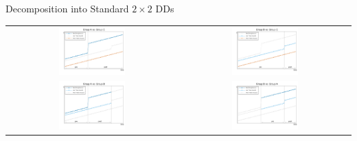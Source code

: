 \documentclass[10pt,xcolor=table,ignorenonframetext,handout,aspectratio=169]{beamer}
\begin{document}
\newpage
\begin{frame}{Decomposition into Standard $2 \times 2$ DDs}

\medskip
\begin{center}
\begin{tabular}{cc}
\includegraphics[width=0.4\textwidth]{fig/GBsubAC.pdf} 
& 
\includegraphics[width=0.4\textwidth]{fig/GBsubBC.pdf} 
\\
\includegraphics[width=0.4\textwidth]{fig/GBsubAB.pdf} 
& 
\includegraphics[width=0.4\textwidth]{fig/GBsubBA.pdf} 
\end{tabular}
\end{center}

\end{frame}
\end{document}
